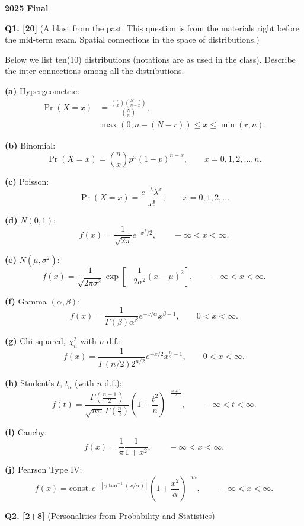 \documentclass[11pt]{article}
\begin{document}
\begin{center}
    {\Large\bfseries 2025 Final}
\end{center}

\vspace{1em}


\textbf{Q1. [20]} (A blast from the past. This question is from the materials right before the mid-term exam. Spatial connections in the space of distributions.)

Below we list ten(10) distributions (notations are as used in the class). Describe the inter-connections among all the distributions.

\textbf{(a)} Hypergeometric:
\[
\begin{aligned}
\Pr(X=x)&=\frac{\binom{r}{x}\binom{N-r}{n-x}}{\binom{N}{n}},\\
&\max(0,n-(N-r))\leq x\leq\min(r,n).
\end{aligned}
\]

\textbf{(b)} Binomial:
\[
\Pr(X=x)=\binom{n}{x}p^x(1-p)^{n-x},
\qquad x=0,1,2,\ldots,n.
\]

\textbf{(c)} Poisson:
\[
\Pr(X=x)=\frac{e^{-\lambda}\lambda^x}{x!},
\qquad x=0,1,2,\ldots
\]

\textbf{(d)} $N(0,1)$:
\[
f(x)=\frac{1}{\sqrt{2\pi}}e^{-x^2/2},
\qquad -\infty<x<\infty.
\]

\textbf{(e)} $N(\mu,\sigma^2)$:
\[
f(x)=\frac{1}{\sqrt{2\pi\sigma^2}}
\exp\left[-\frac{1}{2\sigma^2}(x-\mu)^2\right],
\qquad -\infty<x<\infty.
\]

\textbf{(f)} Gamma $(\alpha,\beta)$:
\[
f(x)=\frac{1}{\Gamma(\beta)\alpha^\beta}e^{-x/\alpha}x^{\beta-1},
\qquad 0<x<\infty.
\]

\textbf{(g)} Chi-squared, $\chi_n^2$ with $n$ d.f.:
\[
f(x)=\frac{1}{\Gamma(n/2)2^{n/2}}e^{-x/2}x^{\frac{n}{2}-1},
\qquad 0<x<\infty.
\]

\textbf{(h)} Student's $t$, $t_n$ (with $n$ d.f.):
\[
f(t)=\frac{\Gamma\left(\frac{n+1}{2}\right)}
{\sqrt{n\pi}\,\Gamma\left(\frac{n}{2}\right)}
\left(1+\frac{t^2}{n}\right)^{-\frac{n+1}{2}},
\qquad -\infty<t<\infty.
\]

\textbf{(i)} Cauchy:
\[
f(x)=\frac{1}{\pi}\frac{1}{1+x^2},
\qquad -\infty<x<\infty.
\]

\textbf{(j)} Pearson Type IV:
\[
f(x)=\text{const.}\,e^{-\left[\gamma\tan^{-1}(x/\alpha)\right]}
\left(1+\frac{x^2}{\alpha}\right)^{-m},
\qquad -\infty<x<\infty.
\]

\bigskip

\textbf{Q2. [2+8]} (Personalities from Probability and Statistics)
\end{document}
